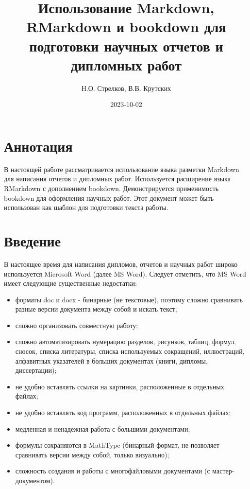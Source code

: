 \documentclass[
  a4paper,
]{book}
\title{Использование Markdown, RMarkdown и bookdown для подготовки научных отчетов и дипломных работ}
\author{Н.О. Стрелков, В.В. Крутских}
\date{2023-10-02}
\providecommand{\tightlist}{%
  \setlength{\itemsep}{0pt}\setlength{\parskip}{0pt}}
\theoremstyle{definition}
\theoremstyle{definition}
\theoremstyle{definition}
\theoremstyle{definition}
\theoremstyle{remark}
\begin{document}
\maketitle


\renewcommand*\contentsname{Содержание}
{
\setcounter{tocdepth}{4}
\tableofcontents
}
\chapter*{Аннотация}\label{index}

В настоящей работе рассматривается использование языка разметки Markdown для написания отчетов и дипломных работ. Используется расширение языка RMarkdown с дополнением bookdown. Демонстрируется применимость bookdown для оформления научных работ. Этот документ может быть использован как шаблон для подготовки текста работы.

\chapter*{Введение}\label{intro}

В настоящее время для написания дипломов, отчетов и научных работ широко используется Microsoft Word (далее MS Word). Следует отметить, что MS Word имеет следующие существенные недостатки:

\begin{itemize}
\tightlist
\item
  форматы doc и docx - бинарные (не текстовые), поэтому сложно сравнивать разные версии документа между собой и искать текст;
\item
  сложно организовать совместную работу;
\item
  сложно автоматизировать нумерацию разделов, рисунков, таблиц, формул, сносок, списка литературы, списка используемых сокращений, иллюстраций, алфавитных указателей в больших документах (книги, дипломы, диссертации);
\item
  не удобно вставлять ссылки на картинки, расположенные в отдельных файлах;
\item
  не удобно вставлять код программ, расположенных в отдельных файлах;
\item
  медленная и ненадежная работа с большими документами;
\item
  формулы сохраняются в MathType (бинарный формат, не позволяет сравнивать версии между собой, только визуально);
\item
  сложность создания и работы с многофайловыми документами (с мастер-документом).
\end{itemize}
\end{document}
